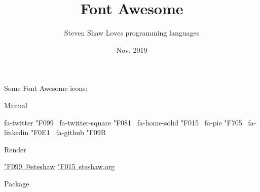 \documentclass[12pt]{article}
\title{Font Awesome}
\author{
  Steven Shaw
  Loves programming languages
}
\date{Nov, 2019}
\newcommand\faIcon[1]{{\faf #1\ }}
\newcommand\twitter{\faIcon{\char"F099}}
\newcommand\twitterSquare{\faIcon{\char"F081}}
\newcommand\homeSolid{\faIcon{\char"F015}}
\newcommand\pie{\faIcon{\char"F705}}
\newcommand\linkedin{\faIcon{\char"F0E1}}
\newcommand\github{\faIcon{\char"F09B}}
\begin{document}
  \maketitle

  Some Font Awesome icons:

  Manual

  fa-twitter \twitter{}
  fa-twitter-square \twitterSquare{}
  fa-home-solid \homeSolid{}
  fa-pie \pie{}
  fa-linkedin \linkedin{}
  fa-github \github{}

  Render

  \href{https://twitter.com/steshaw}{\twitter @steshaw}
  \href{https://steshaw.org/}{\homeSolid steshaw.org}

  Package

  \faStackOverflow{}
\end{document}
